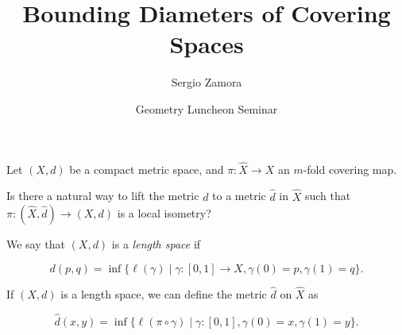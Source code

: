 \documentclass{beamer}
\begin{document}
\title{Bounding Diameters of Covering Spaces}
\author{Sergio Zamora}
\date{Geometry Luncheon Seminar}

\maketitle

\begin{frame}\frametitle{}

Let $(X,d)$ be a compact metric space, and $\pi\colon \hat{X} \rightarrow X$ an $m$-fold covering map.
\bigskip

Is there a natural way to lift the metric $d$ to a metric $\hat{d}$ in $\hat{X}$ such that $\pi \colon  (\hat{X}, \hat{d}) \rightarrow (X,d)$ is a local isometry?
\bigskip
\pause

We say that $(X,d)$ is a \textit{length space} if 

$$d(p,q )  =  \inf \{  \ell (\gamma) \mid \gamma \colon [0,1] \rightarrow X , \gamma(0)=p, \gamma(1)=q   \}.$$

If $(X,d)$ is a length space, we can define the metric $\hat{d}$ on $\hat{X}$ as

$$ \hat{d}(x,y)   =  \inf \{ \ell (\pi \circ \gamma) \mid   \gamma : [0,1] , \gamma(0)=x , \gamma(1) =y     \}.   $$


\end{frame}


\end{document}
